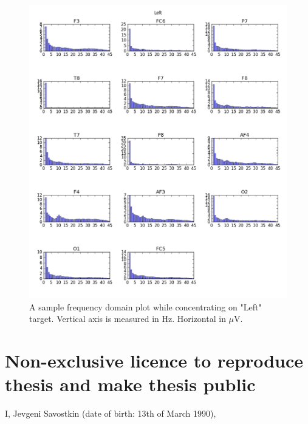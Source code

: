 \documentclass[12pt]{article}
\begin{document}
%

\appendix

\begin{figure} [H]
\begin{center}
\includegraphics[width=1\textwidth]{left_amplitudes}
\caption{A sample frequency domain plot while concentrating on "Left" target. Vertical axis is measured in Hz. Horizontal in $\mu$V.}
\end{center}
\end{figure}

\pagebreak
\section*{\small Non-exclusive licence to reproduce thesis and make thesis public}


I, Jevgeni Savostkin (date of birth: 13th of March 1990),
\end{document}
